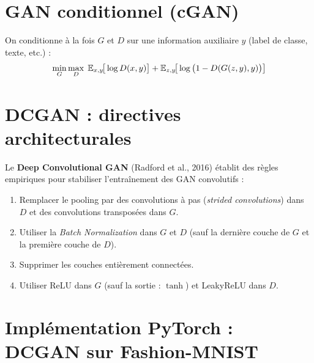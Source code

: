 \section{GAN conditionnel (cGAN)}
\label{sec:cgan}

\begin{definition}
On conditionne \`a la fois $G$ et $D$ sur une information auxiliaire $y$ (label de classe, texte, etc.) :
\begin{equation}
\min_G \max_D \; \mathbb{E}_{x, y}\!\big[\log D(x, y)\big] + \mathbb{E}_{z, y}\!\big[\log\big(1 - D(G(z, y), y)\big)\big]
\end{equation}
\end{definition}

\section{DCGAN : directives architecturales}
\label{sec:dcgan}

Le \textbf{Deep Convolutional GAN} (Radford et al., 2016) \'etablit des r\`egles empiriques pour stabiliser l'entra\^inement des GAN convolutifs :

\begin{bonnepratique}
\begin{enumerate}
    \item Remplacer le pooling par des convolutions \`a pas (\emph{strided convolutions}) dans $D$ et des convolutions transpos\'ees dans $G$.
    \item Utiliser la \emph{Batch Normalization} dans $G$ et $D$ (sauf la derni\`ere couche de $G$ et la premi\`ere couche de $D$).
    \item Supprimer les couches enti\`erement connect\'ees.
    \item Utiliser ReLU dans $G$ (sauf la sortie : $\tanh$) et LeakyReLU dans $D$.
\end{enumerate}
\end{bonnepratique}

\section{Impl\'ementation PyTorch : DCGAN sur Fashion-MNIST}
\label{sec:dcgan-pytorch}

